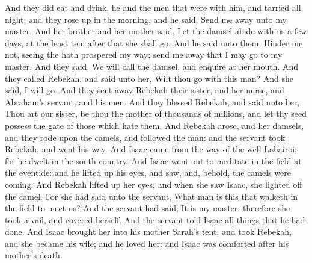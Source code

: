 \begin{biblechapter}
\verse And they did eat and drink, he and the men that were with him, and tarried all night; and they rose up in the morning, and he said, Send me away unto my master.
\verse And her brother and her mother said, Let the damsel abide with us a few days, at the least ten; after that she shall go.
\verse And he said unto them, Hinder me not, seeing the \LORD hath prospered my way; send me away that I may go to my master.
\verse And they said, We will call the damsel, and enquire at her mouth.
\verse And they called Rebekah, and said unto her, Wilt thou go with this man? And she said, I will go.
\verse And they sent away Rebekah their sister, and her nurse, and Abraham's servant, and his men.
\verse And they blessed Rebekah, and said unto her, Thou art our sister, be thou the mother of thousands of millions, and let thy seed possess the gate of those which hate them.
\verse And Rebekah arose, and her damsels, and they rode upon the camels, and followed the man: and the servant took Rebekah, and went his way.
\verse And Isaac came from the way of the well Lahairoi; for he dwelt in the south country.
\verse And Isaac went out to meditate in the field at the eventide: and he lifted up his eyes, and saw, and, behold, the camels were coming.
\verse And Rebekah lifted up her eyes, and when she saw Isaac, she lighted off the camel.
\verse For she had said unto the servant, What man is this that walketh in the field to meet us? And the servant had said, It is my master: therefore she took a vail, and covered herself.
\verse And the servant told Isaac all things that he had done.
\verse And Isaac brought her into his mother Sarah's tent, and took Rebekah, and she became his wife; and he loved her: and Isaac was comforted after his mother's death.
\end{biblechapter}

